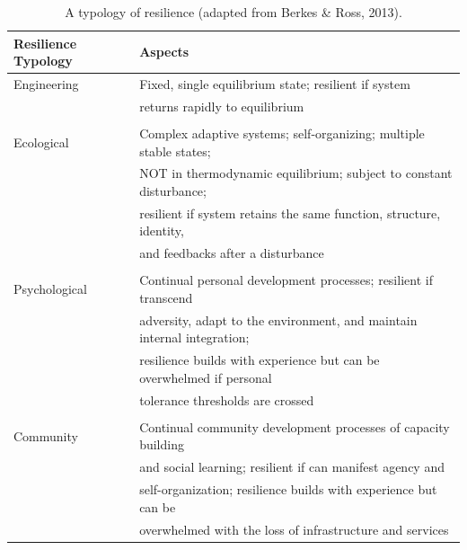 \documentclass[11pt,fleqn]{book} %
\begin{document}
\begin{table}[!htbp]
  \caption{A typology of resilience (adapted from Berkes \& Ross, 2013).} 
  \label{tab:bm1} 
\begin{tabular}{ll}
\toprule
Resilience Typology &  Aspects \\
\midrule
Engineering & Fixed, single equilibrium state; resilient if system\\
            & returns rapidly to equilibrium \\
&  \\
Ecological & Complex adaptive systems; self-organizing; multiple stable states;\\
           & NOT in thermodynamic equilibrium; subject to constant disturbance;\\
           & resilient if system retains the same function, structure, identity, \\
           & and feedbacks after a disturbance\\
& \\
Psychological & Continual personal development processes; resilient if transcend \\
              & adversity, adapt to the environment, and maintain internal integration; \\
              & resilience builds with experience but can be overwhelmed if personal \\
              & tolerance thresholds are crossed\\
& \\
Community  & Continual community development processes of capacity building \\
           & and social learning; resilient if can manifest agency and \\
           & self-organization; resilience builds with experience but can be \\
           & overwhelmed with the loss of infrastructure and services\\
\bottomrule
\end{tabular}
\end{table} 
\end{document}
